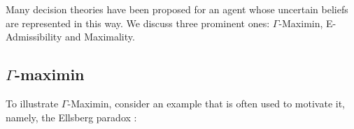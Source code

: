 \documentclass[a4paper]{article}
\newcommand{\todoold}[2][]{\todo[backgroundcolor=white,bordercolor=orange!10,linecolor=gray!10, #1,caption={},textcolor=gray]{Pre-rev: #2}}
\newenvironment{CCM rewritten}
{\begingroup\color{blue}} %
{\endgroup}              %
\begin{document}
Many decision theories have been proposed for an agent whose uncertain beliefs are represented in this way. We discuss three prominent ones: $\Gamma$-Maximin, E-Admissibility and Maximality. %



\subsection{$\Gamma$-maximin}\label{sect:gamma}


To illustrate $\Gamma$-Maximin, consider an example that is often used to motivate it, namely, the Ellsberg paradox \citep{ellsberg1961rasa}:
\end{document}
